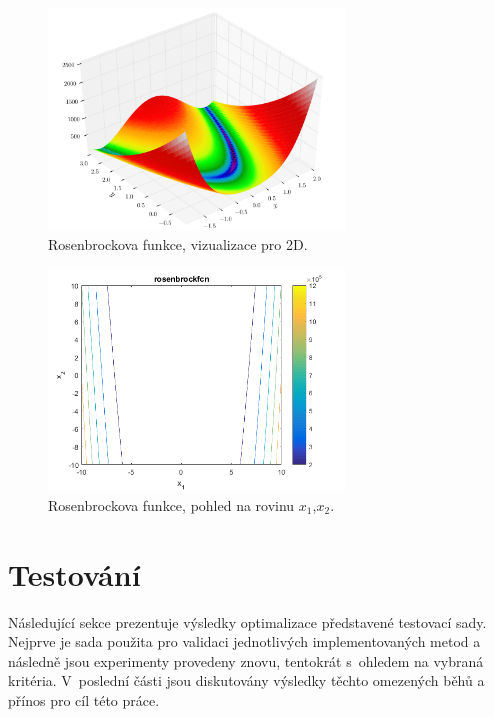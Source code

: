 \begin{figure}[H]
	\centering
	\includegraphics[width=0.7\textwidth]{obrazky-figures/rosenbrock.pdf}
	\caption{Rosenbrockova funkce, vizualizace pro 2D.}
	\label{fg:rosen}
\end{figure}
\begin{figure}[H]
	\centering
	\includegraphics[width=0.7\textwidth]{obrazky-figures/rosenbrockfcn_contour.png}
	\caption{Rosenbrockova funkce, pohled na rovinu $x_1$,$x_2$.}
	\label{fg:rosenContour}
\end{figure}

\section{Testování}
Následující sekce prezentuje výsledky optimalizace představené testovací sady. Nejprve je sada použita pro validaci jednotlivých implementovaných metod a následně jsou experimenty provedeny znovu, tentokrát s~ohledem na vybraná kritéria. V~poslední části jsou diskutovány výsledky těchto omezených běhů a přínos pro cíl této práce.
